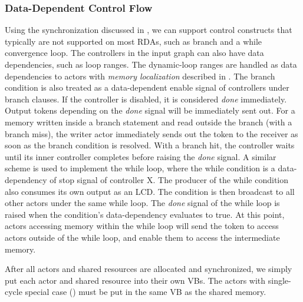 \subsubsection{Data-Dependent Control Flow}
Using the synchronization discussed in , we can support control constructs that typically are not supported on most RDAs, such as branch and a while convergence loop.
The controllers in the input graph can also have data dependencies, such as loop ranges. 
The dynamic-loop ranges are handled as data dependencies to actors with \emph{memory localization} described in .
The branch condition is also treated as a data-dependent enable signal of controllers under branch clauses.
If the controller is disabled, it is considered {\em done} immediately.
Output tokens depending on the {\em done} signal will be immediately sent out.
For a memory written inside a branch statement and read outside the branch (with a branch miss), the writer actor immediately sends out the token to the receiver
as soon as the branch condition is resolved. 
With a branch hit, the controller waits until its inner controller completes before raising the {\em done} signal.
A similar scheme is used to implement the while loop, where the while condition is a data-dependency of stop signal of controller X. 
The producer of the while condition also consumes its own output as an LCD. 
The condition is then broadcast to all other actors under the same while loop. 
The {\em done} signal of the while loop is raised when the condition's data-dependency evaluates to true.
At this point, actors accessing memory within the while loop will send the token to access actors outside of the while loop, and enable them to access the intermediate memory.

After all actors and shared resources are allocated and synchronized, we simply put each actor and shared resource into their own VBs.
The actors with single-cycle special case () must be put in the same VB as the shared memory.

